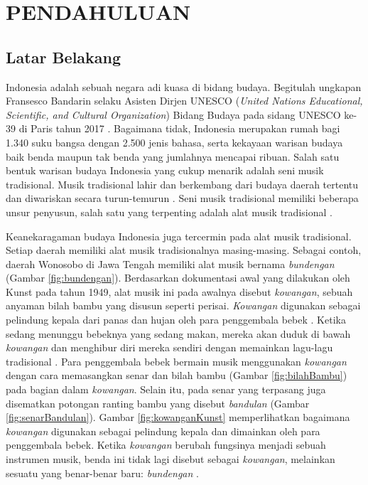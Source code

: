\chapter{PENDAHULUAN}\label{pendahuluan}


\section{Latar Belakang}\label{subBab:latar belakang}
Indonesia adalah sebuah negara adi kuasa di bidang budaya. Begitulah ungkapan Fransesco Bandarin selaku Asisten Dirjen UNESCO (\textit{United Nations Educational, Scientific, and Cultural Organization}) Bidang Budaya pada sidang UNESCO ke-39 di Paris tahun 2017 \cite{statistikBudaya}. Bagaimana tidak, Indonesia merupakan rumah bagi 1.340 suku bangsa dengan 2.500 jenis bahasa, serta kekayaan warisan budaya baik benda maupun tak benda yang jumlahnya mencapai ribuan. Salah satu bentuk warisan budaya Indonesia yang cukup menarik adalah seni musik tradisional. Musik tradisional lahir dan berkembang dari budaya daerah tertentu dan diwariskan secara turun-temurun \cite{bukuMusik}. Seni musik tradisional memiliki beberapa unsur penyusun, salah satu yang terpenting adalah alat musik tradisional \cite{webKemendikbud}. \par 
Keanekaragaman budaya Indonesia juga tercermin pada alat musik tradisional. Setiap daerah memiliki alat musik tradisionalnya masing-masing. Sebagai contoh, daerah Wonosobo di Jawa Tengah memiliki alat musik bernama \textit{bundengan} (Gambar \ref{fig:bundengan}). Berdasarkan dokumentasi awal yang dilakukan oleh Kunst pada tahun 1949, alat musik ini pada awalnya disebut \textit{kowangan}, sebuah anyaman bilah bambu yang disusun seperti perisai. \textit{Kowangan} digunakan sebagai pelindung kepala dari panas dan hujan oleh para penggembala bebek \cite{kunst}. Ketika sedang menunggu bebeknya yang sedang makan, mereka akan duduk di bawah \textit{kowangan} dan menghibur diri mereka sendiri dengan memainkan lagu-lagu tradisional \cite{skripsiSaid}. Para penggembala bebek bermain musik menggunakan \textit{kowangan} dengan cara memasangkan senar dan bilah bambu (Gambar \ref{fig:bilahBambu}) pada bagian dalam \textit{kowangan}. Selain itu, pada senar yang terpasang juga disematkan potongan ranting bambu yang disebut \textit{bandulan} (Gambar \ref{fig:senarBandulan}). Gambar \ref{fig:kowanganKunst} memperlihatkan bagaimana \textit{kowangan} digunakan sebagai pelindung kepala dan dimainkan oleh para penggembala bebek. Ketika \textit{kowangan} berubah fungsinya menjadi sebuah instrumen musik, benda ini tidak lagi disebut sebagai \textit{kowangan}, melainkan sesuatu yang benar-benar baru: \textit{bundengan} \cite{palmer}. \par  
